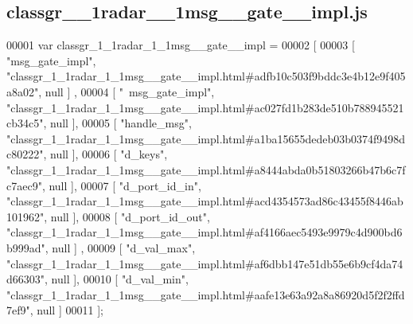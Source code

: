 \subsection{classgr\+\_\+\_\+1radar\+\_\+\_\+1msg\+\_\+\+\_\+gate\+\_\+\+\_\+impl.\+js}
\label{classgr__1__1radar__1__1msg____gate____impl_8js_source}

\begin{DoxyCode}
00001 var classgr_1_1radar_1_1msg__gate__impl =
00002 [
00003     [ \textcolor{stringliteral}{"msg\_gate\_impl"}, \textcolor{stringliteral}{"classgr\_1\_1radar\_1\_1msg\_\_gate\_\_impl.html#adfb10c503f9bddc3e4b12e9f405a8a02"}, null ]
      ,
00004     [ \textcolor{stringliteral}{"~msg\_gate\_impl"}, \textcolor{stringliteral}{"classgr\_1\_1radar\_1\_1msg\_\_gate\_\_impl.html#ac027fd1b283de510b788945521cb34c5"}, null 
      ],
00005     [ \textcolor{stringliteral}{"handle\_msg"}, \textcolor{stringliteral}{"classgr\_1\_1radar\_1\_1msg\_\_gate\_\_impl.html#a1ba15655dedeb03b0374f9498dc80222"}, null ],
00006     [ \textcolor{stringliteral}{"d\_keys"}, \textcolor{stringliteral}{"classgr\_1\_1radar\_1\_1msg\_\_gate\_\_impl.html#a8444abda0b51803266b47b6c7fc7aec9"}, null ],
00007     [ \textcolor{stringliteral}{"d\_port\_id\_in"}, \textcolor{stringliteral}{"classgr\_1\_1radar\_1\_1msg\_\_gate\_\_impl.html#acd4354573ad86c43455f8446ab101962"}, null ],
00008     [ \textcolor{stringliteral}{"d\_port\_id\_out"}, \textcolor{stringliteral}{"classgr\_1\_1radar\_1\_1msg\_\_gate\_\_impl.html#af4166aec5493e9979c4d900bd6b999ad"}, null ]
      ,
00009     [ \textcolor{stringliteral}{"d\_val\_max"}, \textcolor{stringliteral}{"classgr\_1\_1radar\_1\_1msg\_\_gate\_\_impl.html#af6dbb147e51db55e6b9cf4da74d66303"}, null ],
00010     [ \textcolor{stringliteral}{"d\_val\_min"}, \textcolor{stringliteral}{"classgr\_1\_1radar\_1\_1msg\_\_gate\_\_impl.html#aafe13e63a92a8a86920d5f2f2ffd7ef9"}, null ]
00011 ];
\end{DoxyCode}
